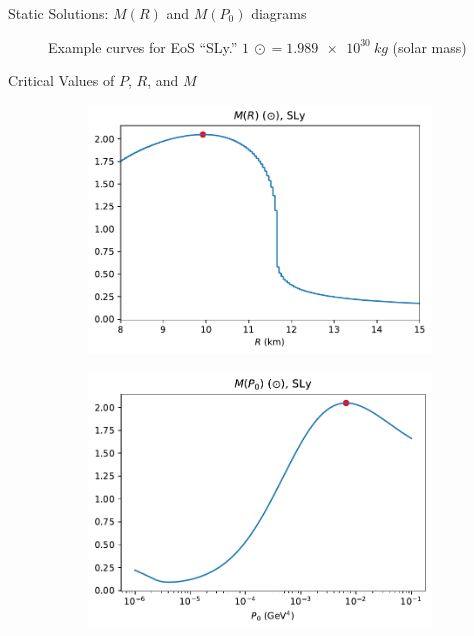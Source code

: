 \documentclass[]{beamer}
\begin{document}
\begin{frame}{Static Solutions: $M(R)$ and $M(P_0)$ diagrams}
\begin{figure}[h!]
\begin{subfigure}{.5\textwidth}
            \end{subfigure}
            \caption[]{Example curves for EoS ``SLy.'' $\SI{1}{\odot} = \SI{1.989e+30}{kg}$ (solar mass)}
        \end{figure}
    \end{frame}

    \begin{frame}{Critical Values of $P$, $R$, and $M$}
        \vspace{-10pt}
        \begin{figure}[h!]
            \centering
            \begin{subfigure}{.5\textwidth}
                \includegraphics[width = \textwidth]{r_analysis,SLy.pdf}
            \end{subfigure}%
            \begin{subfigure}{.5\textwidth}
                \includegraphics[width = \textwidth]{p0_analysis,SLy.pdf}

\end{subfigure}
\end{figure}
\end{frame}
\end{document}
